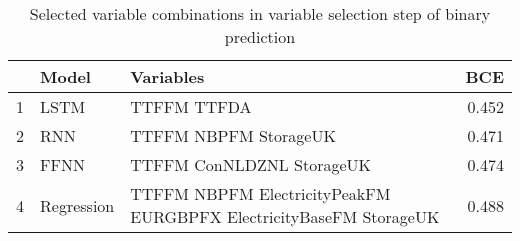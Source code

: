 \begin{table}[ht]
\centering
\begin{tabular}{rllr}
  \hline
 & Model & Variables & BCE \\ 
  \hline
1 & LSTM & TTFFM TTFDA & 0.452 \\ 
  2 & RNN & TTFFM NBPFM StorageUK & 0.471 \\ 
  3 & FFNN & TTFFM ConNLDZNL StorageUK & 0.474 \\ 
  4 & Regression & TTFFM NBPFM ElectricityPeakFM EURGBPFX ElectricityBaseFM StorageUK & 0.488 \\ 
   \hline
\end{tabular}
\caption{Selected variable combinations in variable selection step of binary prediction} 
\label{tab:binary.var.selection.short}
\end{table}
